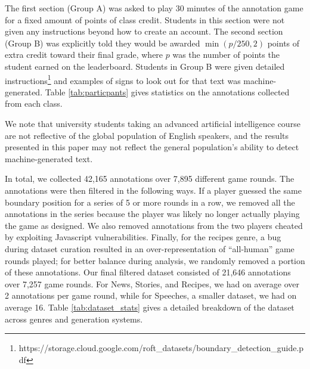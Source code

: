 The first section (Group A) was asked to play 30 minutes of the \ROFT{} annotation game for a fixed amount of points of class credit.
Students in this section were not given any instructions beyond how to create an account.
The second section (Group B) was explicitly told they would be awarded $\min(p/250, 2)$ points of extra credit toward their final grade, where $p$ was the number of points the student earned on the \ROFT{} leaderboard.
Students in Group B were given detailed instructions\footnote{
{\tiny{https://storage.cloud.google.com/roft\_datasets/boundary\_detection\_guide.pdf}}
} and examples of signs to look out for that text was machine-generated.
Table \ref{tab:particpants} gives statistics on the annotations collected from each class.

We note that university students taking an advanced artificial intelligence course are not reflective of the global population of English speakers, and the results presented in this paper may not reflect the general population's ability to detect machine-generated text. 

In total, we collected 42,165 annotations over 7,895 different game rounds.
The annotations were then filtered in the following ways.
If a player guessed the same boundary position for a series of 5 or more rounds in a row, we removed all the annotations in the series because the player was likely no longer actually playing the game as designed.
We also removed annotations from the two players cheated by exploiting Javascript vulnerabilities.
Finally, for the recipes genre, a bug during dataset curation resulted in an over-representation of ``all-human'' game rounds played;
for better balance during analysis, we randomly removed a portion of these annotations.
Our final filtered dataset consisted of 21,646 annotations over 7,257 game rounds.
For News, Stories, and Recipes, we had on average over 2 annotations per game round, while for Speeches, a smaller dataset, we had on average 16.
Table \ref{tab:dataset_stats} gives a detailed breakdown of the dataset across genres and generation systems.


